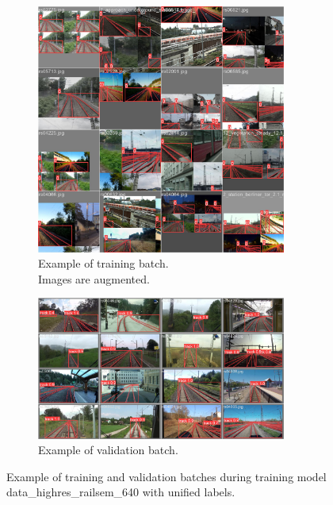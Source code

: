 \documentclass[Master,MDS,english]{BASE/twbook} %
\begin{document}
\begin{figure}[H]
\centering
\begin{subfigure}[t]{.5\textwidth}
  \centering
  \includegraphics[width=0.9\textwidth]{images/yolo/highres/train_batch0}
  \caption{Example of training batch.\\ Images are augmented.}
  \label{fig:mosaic_augmentation_highres}
\end{subfigure}%
\begin{subfigure}[t]{.5\textwidth}
  \centering
  \includegraphics[width=0.9\textwidth]{images/yolo/highres/val_batch1_pred}
  \caption{Example of validation batch. }
\end{subfigure}
\caption{Example of training and validation batches during training model data\_highres\_railsem\_640 with unified labels.}
\label{fig:yolo_highres_example}
\end{figure}
\end{document}
